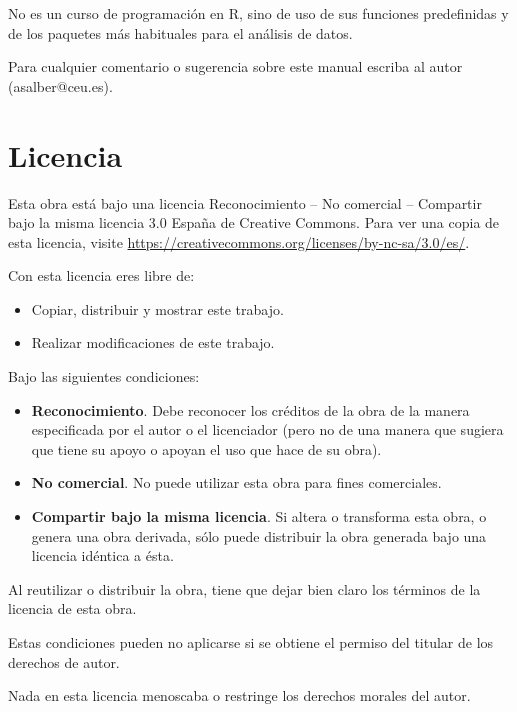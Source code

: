 \documentclass[
  a4paper,
]{scrreport}
\providecommand{\tightlist}{%
  \setlength{\itemsep}{0pt}\setlength{\parskip}{0pt}}\usepackage{longtable,booktabs,array}
\theoremstyle{definition}
\theoremstyle{definition}
\theoremstyle{remark}
\begin{document}
No es un curso de programación en R, sino de uso de sus funciones
predefinidas y de los paquetes más habituales para el análisis de datos.

Para cualquier comentario o sugerencia sobre este manual escriba al
autor (asalber@ceu.es).

\hypertarget{licencia}{%
\section*{Licencia}\label{licencia}}


Esta obra está bajo una licencia Reconocimiento -- No comercial --
Compartir bajo la misma licencia 3.0 España de Creative Commons. Para
ver una copia de esta licencia, visite
\url{https://creativecommons.org/licenses/by-nc-sa/3.0/es/}.

Con esta licencia eres libre de:

\begin{itemize}
\tightlist
\item
  Copiar, distribuir y mostrar este trabajo.
\item
  Realizar modificaciones de este trabajo.
\end{itemize}

Bajo las siguientes condiciones:

\begin{itemize}
\item
  \textbf{Reconocimiento}. Debe reconocer los créditos de la obra de la
  manera especificada por el autor o el licenciador (pero no de una
  manera que sugiera que tiene su apoyo o apoyan el uso que hace de su
  obra).
\item
  \textbf{No comercial}. No puede utilizar esta obra para fines
  comerciales.
\item
  \textbf{Compartir bajo la misma licencia}. Si altera o transforma esta
  obra, o genera una obra derivada, sólo puede distribuir la obra
  generada bajo una licencia idéntica a ésta.
\end{itemize}

Al reutilizar o distribuir la obra, tiene que dejar bien claro los
términos de la licencia de esta obra.

Estas condiciones pueden no aplicarse si se obtiene el permiso del
titular de los derechos de autor.

Nada en esta licencia menoscaba o restringe los derechos morales del
autor.
\end{document}
